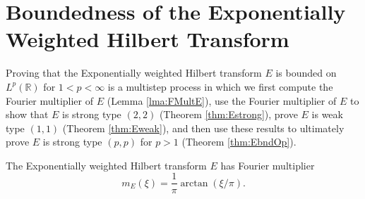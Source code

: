 \documentclass[../dissertation.tex]{subfiles}
\begin{document}
\section{Boundedness of the Exponentially Weighted Hilbert Transform}\label{sec2.2:BndE}

Proving that the Exponentially weighted Hilbert transform $E$ is bounded on 
$L^p(\mathbb R)$ for $1< p < \infty$ is a multistep process in which we first compute
the Fourier multiplier of $E$ (Lemma \ref{lma:FMultE}), use the Fourier multiplier
of $E$ to show that $E$ is strong type $(2,2)$ (Theorem \ref{thm:Estrong}), prove $E$ is 
weak type $(1, 1)$ (Theorem \ref{thm:Eweak}), and then use these results to ultimately
prove $E$ is strong type $(p, p)$ for $p>1$ (Theorem \ref{thm:EbndOp}).


\begin{lma}\label{lma:FMultE}
	The Exponentially weighted Hilbert transform $E$ has Fourier multiplier
	$$m_E(\xi) = \frac{1}{\pi} \arctan(\xi/\pi).$$
\end{lma}
\end{document}

